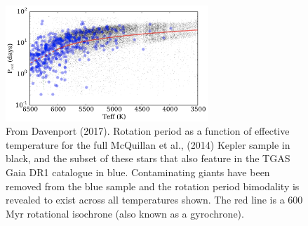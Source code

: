 \documentclass[useAMS, usenatbib, preprint, 12pt]{aastex}
\begin{document}

\begin{figure}
\begin{center}
\includegraphics[width=3in, clip=true]{Davenport.png}
\caption{From Davenport (2017).
    Rotation period as a function of effective
temperature for the full McQuillan et al., (2014) Kepler sample in black, and
the subset of these stars that also feature in the TGAS Gaia DR1 catalogue in
blue. Contaminating giants have been removed from the blue sample and the
rotation period bimodality is revealed to exist across all temperatures shown.
    The red line is a 600 Myr rotational isochrone (also known as a gyrochrone).}
\label{fig:davenport}
\end{center}
\end{figure}
\end{document}
